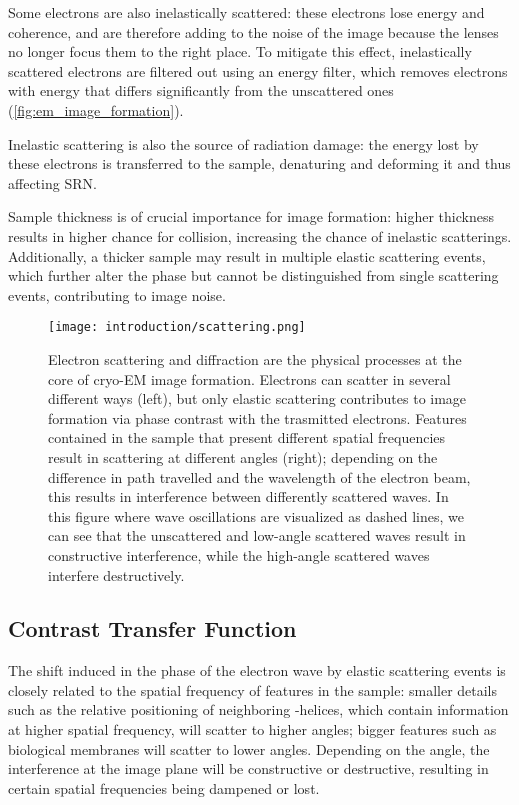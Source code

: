 Some electrons are also inelastically scattered: these electrons lose energy and coherence, and are therefore adding to the noise of the image because the lenses no longer focus them to the right place.
To mitigate this effect, inelastically scattered electrons are filtered out using an energy filter, which removes electrons with energy that differs significantly from the unscattered ones (\autoref{fig:em_image_formation}).

Inelastic scattering is also the source of radiation damage: the energy lost by these electrons is transferred to the sample, denaturing and deforming it and thus affecting SRN.

Sample thickness is of crucial importance for image formation: higher thickness results in higher chance for collision, increasing the chance of inelastic scatterings.
Additionally, a thicker sample may result in multiple elastic scattering events, which further alter the phase but cannot be distinguished from single scattering events, contributing to image noise.

\begin{figure}[ht]
    \centering
    \texttt{[image: introduction/scattering.png]}
    \caption[Image formation]{Electron scattering and diffraction are the physical processes at the core of cryo-EM image formation. Electrons can scatter in several different ways (left), but only elastic scattering contributes to image formation via phase contrast with the trasmitted electrons. Features contained in the sample that present different spatial frequencies result in scattering at different angles (right); depending on the difference in path travelled and the wavelength of the electron beam, this results in interference between differently scattered waves. In this figure where wave oscillations are visualized as dashed lines, we can see that the unscattered and low-angle scattered waves result in constructive interference, while the high-angle scattered waves interfere destructively.}
    \label{fig:em_image_formation}
\end{figure}

\subsection{Contrast Transfer Function}\label{em_ctf}
The shift induced in the phase of the electron wave by elastic scattering events is closely related to the spatial frequency of features in the sample: smaller details such as the relative positioning of neighboring \alpha-helices, which contain information at higher spatial frequency, will scatter to higher angles; bigger features such as biological membranes will scatter to lower angles.
Depending on the angle, the interference at the image plane will be constructive or destructive, resulting in certain spatial frequencies being dampened or lost.

